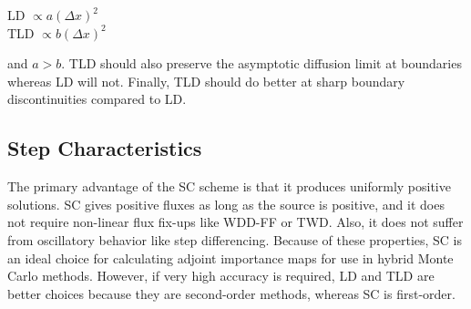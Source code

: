 \documentclass[12pt]{article}
\begin{document}
LD $\propto a(\Delta x)^2$\\
TLD $\propto b(\Delta x)^2$

and $a>b$. TLD should also preserve the asymptotic diffusion limit at boundaries whereas LD will not. Finally, TLD should do better at sharp boundary discontinuities compared to LD.


\subsection*{Step Characteristics}
\label{sec:step-characteristics}

The primary advantage of the SC scheme is that it produces uniformly positive
solutions. SC gives positive fluxes as long as the source is positive, and it
does not require non-linear flux fix-ups like WDD-FF or TWD.  Also, it does
not suffer from oscillatory behavior like step differencing.  Because of these
properties, SC is an ideal choice for calculating adjoint importance maps for
use in hybrid Monte Carlo methods.  However, if very high accuracy is
required, LD and TLD are better choices because they are second-order methods,
whereas SC is first-order.
\end{document}
